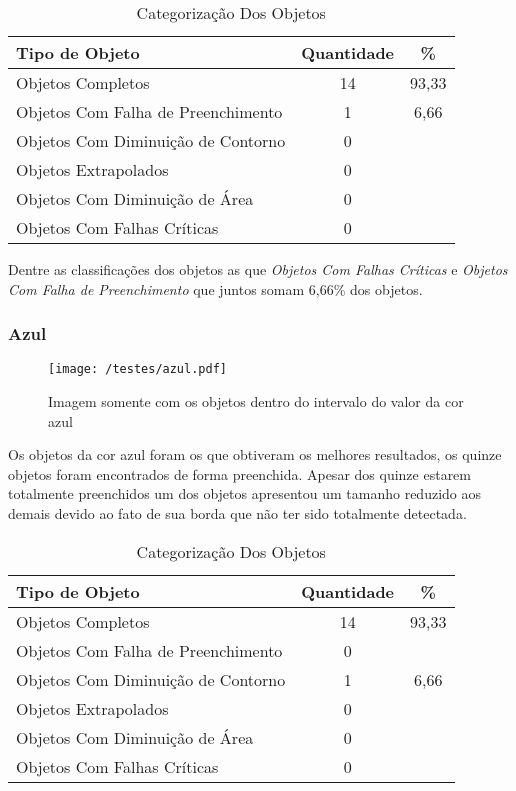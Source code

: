 	\begin{table}[H]
\centering
\begin{tabular}{l|c|c}
Tipo de Objeto & Quantidade & \%  \\%
\hline                               %
Objetos Completos & 14 & 93,33 \\
\hline 
Objetos Com Falha de Preenchimento & 1 & 6,66 \\
\hline 
Objetos Com Diminuição de Contorno & 0 &\\
\hline 
Objetos Extrapolados & 0 &\\
\hline 
Objetos Com Diminuição de Área &  0 &\\
\hline 
Objetos Com Falhas Críticas & 0 &\\
\hline 
\end{tabular}
\caption{Categorização Dos Objetos}
\end{table}

Dentre as classificações dos objetos as que  \textit{Objetos Com Falhas Críticas} e \textit{Objetos Com Falha de Preenchimento} que juntos somam 6,66\% dos objetos.

\subsubsection{Azul}
	\begin{figure}[H]
		\centering
		\texttt{[image: /testes/azul.pdf]}
		\caption{Imagem somente com os objetos dentro do intervalo do valor da cor azul}
		\label{disposicaoparte}
	\end{figure}

Os objetos da cor azul foram os que obtiveram os melhores resultados, os quinze objetos foram encontrados de forma preenchida.	Apesar dos quinze estarem totalmente preenchidos um dos objetos apresentou um tamanho reduzido aos demais devido ao fato de sua borda que não ter sido totalmente detectada.

\begin{table}[h]
\centering
\begin{tabular}{l|c|c}
Tipo de Objeto & Quantidade & \% \\ %
\hline                               %
Objetos Completos & 14 & 93,33 \\
\hline 
Objetos Com Falha de Preenchimento & 0\\
\hline 
Objetos Com Diminuição de Contorno &  1 & 6,66
\\
\hline 
Objetos Extrapolados &  0\\
\hline 
Objetos Com Diminuição de Área & 0 \\
\hline 
Objetos Com Falhas Críticas & 0 \\
\hline 
\end{tabular}
\caption{Categorização Dos Objetos}
\end{table}

